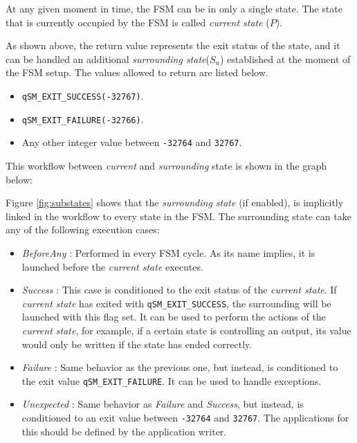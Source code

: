 At any given moment in time, the FSM can be in only a single state. The state that is currently occupied by the FSM is called \textit{current state} ($P$).

As shown above, the return value represents the exit status of the state, and it can be handled an additional \textit{surrounding state}($S_u$) established at the moment of the FSM setup. The values allowed to return are listed below.

\begin{itemize}
    \item \lstinline{qSM_EXIT_SUCCESS(-32767)}.
    \item \lstinline{qSM_EXIT_FAILURE(-32766)}.
    \item Any other integer value between \lstinline{-32764} and \lstinline{32767}.
\end{itemize} 

This workflow between \textit{current} and \textit{surrounding} state is shown in the graph below: 


Figure \ref{fig:substates}  shows that the \textit{surrounding state} (if enabled), is implicitly linked in the workflow to every state in the FSM. The surrounding state can take any of the following execution cases:

\begin{itemize}
    \item \textit{BeforeAny} : Performed in every FSM cycle. As its name implies, it is launched before the \textit{current state} executes. 
    
    \item \textit{Success} : This case is conditioned to the exit status of the \textit{current state}. If \textit{current state} has exited with  \lstinline{qSM_EXIT_SUCCESS}, the surrounding will be launched with this flag set. It can be used to perform the actions of the \textit{current state}, for example, if a certain state is controlling an output, its value would only be written if the state has ended correctly.
    
    \item \textit{Failure} : Same behavior as the previous one, but instead, is conditioned to the exit value \lstinline{qSM_EXIT_FAILURE}. It can be used to handle exceptions.
    
    \item \textit{Unexpected} : Same behavior as \textit{Failure} and \textit{Success}, but instead, is conditioned to an exit value between \lstinline{-32764} and \lstinline{32767}. The applications for this should be defined by the application writer.
\end{itemize}

